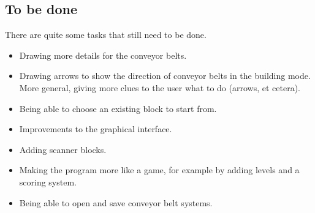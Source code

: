 \subsection{To be done}
There are quite some tasks that still need to be done.
\begin{itemize}
  \item Drawing more details for the conveyor belts.
  \item Drawing arrows to show the direction of conveyor belts in the building mode. More general, giving more clues to the user what to do (arrows, et cetera).
  \item Being able to choose an existing block to start from.
  \item Improvements to the graphical interface.
  \item Adding scanner blocks.
  \item Making the program more like a game, for example by adding levels and a scoring system.
  \item Being able to open and save conveyor belt systems.
\end{itemize}
